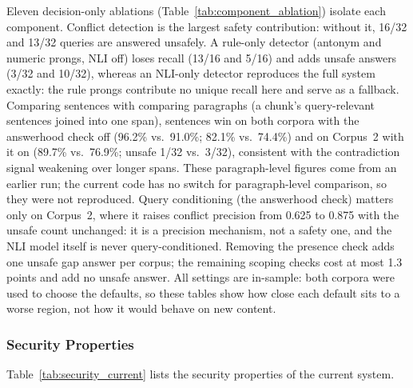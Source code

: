 \documentclass[conference]{IEEEtran}
\begin{document}
Eleven decision-only ablations (Table~\ref{tab:component_ablation}) isolate
each component. Conflict detection is the largest safety contribution:
without it, 16/32 and 13/32 queries are answered unsafely. A rule-only
detector (antonym and numeric prongs, NLI off) loses recall (13/16 and
5/16) and adds unsafe answers (3/32 and 10/32), whereas an NLI-only
detector reproduces the full system exactly: the rule prongs contribute no
unique recall here and serve as a fallback. Comparing sentences with
comparing paragraphs (a chunk's query-relevant sentences joined into one
span), sentences win on both corpora with the answerhood check off
(96.2\% vs.\ 91.0\%; 82.1\% vs.\ 74.4\%) and on Corpus~2 with it on
(89.7\% vs.\ 76.9\%; unsafe 1/32 vs.\ 3/32), consistent with the
contradiction signal weakening over longer spans. These paragraph-level
figures come from an earlier run; the current code has no switch for
paragraph-level comparison, so they were not reproduced. Query conditioning (the
answerhood check) matters only on Corpus~2, where it raises conflict
precision from 0.625 to 0.875 with the unsafe count unchanged: it is a
precision mechanism, not a safety one, and the NLI model itself is never
query-conditioned. Removing the presence check adds one unsafe gap answer
per corpus; the remaining scoping checks cost at most 1.3 points and add no
unsafe answer. All settings are in-sample: both corpora were used to choose
the defaults, so these tables show how close each default sits to a worse
region, not how it would behave on new content.

\subsubsection{Security Properties}
\label{sec:security_properties}
Table~\ref{tab:security_current} lists the security properties of the current
system.
\end{document}
